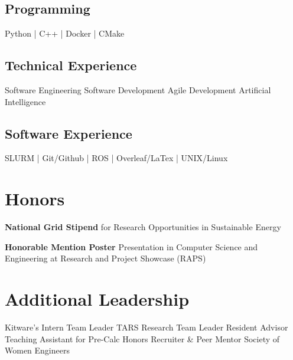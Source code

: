 \documentclass[]{deedy-resume-reversed}
\begin{document}
\begin{minipage}[t]{0.29\textwidth}
\subsection{Programming}
Python | C++ | Docker | CMake
\sectionsep

\subsection{Technical Experience}
Software Engineering \newline
Software Development \newline
Agile Development \newline 
Artificial Intelligence %
\sectionsep

\subsection{Software Experience}
SLURM | Git/Github | ROS | \newline
Overleaf/LaTex |\newline
UNIX/Linux 
\sectionsep


\section{Honors}
\textbf{National Grid Stipend} for Research Opportunities in Sustainable Energy
\sectionsep

\textbf{Honorable Mention Poster} Presentation in Computer Science and Engineering at Research and Project Showcase (RAPS)
\sectionsep

\section{Additional Leadership}
Kitware's Intern Team Leader \newline
TARS Research Team Leader \newline
Resident Advisor \newline
Teaching Assistant for Pre-Calc \newline
Honors Recruiter \& Peer Mentor \newline
Society of Women Engineers
\sectionsep


\end{minipage}
\end{document}
